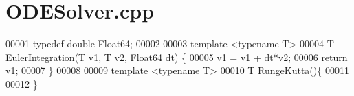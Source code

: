 \hypertarget{_o_d_e_solver_8cpp_source}{}\section{O\+D\+E\+Solver.\+cpp}
\label{_o_d_e_solver_8cpp_source}

\begin{DoxyCode}
00001 \textcolor{keyword}{typedef} \textcolor{keywordtype}{double} Float64;
00002 
00003 \textcolor{keyword}{template} <\textcolor{keyword}{typename} T>
00004 T EulerIntegration(T v1, T v2, Float64 dt) \{
00005     v1 = v1 + dt*v2;
00006     \textcolor{keywordflow}{return} v1;
00007 \}
00008 
00009 \textcolor{keyword}{template} <\textcolor{keyword}{typename} T>
00010 T RungeKutta()\{
00011 
00012 \}
\end{DoxyCode}
